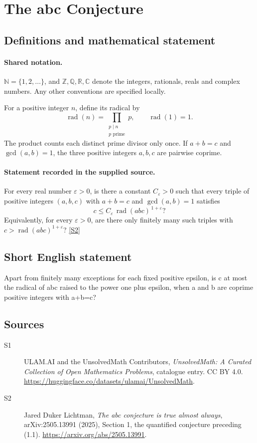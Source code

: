 \documentclass[11pt]{article}
\newcommand{\sref}[2]{\hyperlink{source:#1:#2}{[S#2]}}
\begin{document}
\section{The abc Conjecture}\label{statement}

\subsection{Definitions and mathematical statement}

\paragraph{Shared notation.}$\mathbb N=\{1,2,\ldots\}$, and $\mathbb Z,\mathbb Q,\mathbb R,\mathbb C$ denote the integers, rationals, reals and complex numbers. Any other conventions are specified locally.


For a positive integer \(n\), define its radical by
\[
 \operatorname{rad}(n)=\prod_{\substack{p\mid n\\p\text{ prime}}}p,
 \qquad \operatorname{rad}(1)=1.
\]
The product counts each distinct prime divisor only once.
If \(a+b=c\) and \(\gcd(a,b)=1\), the three positive integers
\(a,b,c\) are pairwise coprime.
\paragraph{Statement recorded in the supplied source.}
For every real number \(\varepsilon>0\), is there a constant
\(C_\varepsilon>0\) such that every triple of positive integers
\((a,b,c)\) with \(a+b=c\) and \(\gcd(a,b)=1\) satisfies
\[
 c\le C_\varepsilon\,\operatorname{rad}(abc)^{\,1+\varepsilon}?
\]
Equivalently, for every \(\varepsilon>0\), are there only finitely many
such triples with \(c>\operatorname{rad}(abc)^{1+\varepsilon}\)? \sref{statement}{2}
\subsection{Short English statement}
Apart from finitely many exceptions for each fixed positive epsilon, is c at most the radical of abc raised to the power one plus epsilon, when a and b are coprime positive integers with a+b=c?
\subsection{Sources}
\begin{description}
\item[\hypertarget{source:statement:1}{S1}] ULAM.AI and the UnsolvedMath Contributors, \emph{UnsolvedMath: A Curated Collection of Open Mathematics Problems}, catalogue entry. CC BY 4.0. \url{https://huggingface.co/datasets/ulamai/UnsolvedMath}.
\item[\hypertarget{source:statement:2}{S2}] Jared Duker Lichtman, \emph{The abc conjecture is true almost always}, arXiv:2505.13991 (2025), Section 1, the quantified conjecture preceding (1.1). \url{https://arxiv.org/abs/2505.13991}.
\end{description}
\label{end:statement}
\end{document}
